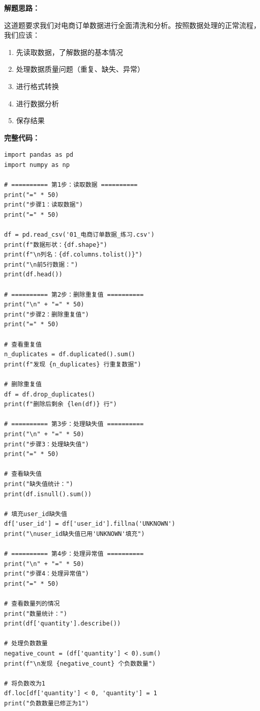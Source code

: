 \documentclass[12pt,a4paper]{article}
\begin{document}
\begin{practicebox}

\textbf{解题思路：}

这道题要求我们对电商订单数据进行全面清洗和分析。按照数据处理的正常流程，我们应该：
\begin{enumerate}
    \item 先读取数据，了解数据的基本情况
    \item 处理数据质量问题（重复、缺失、异常）
    \item 进行格式转换
    \item 进行数据分析
    \item 保存结果
\end{enumerate}

\textbf{完整代码：}

\begin{lstlisting}[caption={电商订单数据处理完整解答}]
import pandas as pd
import numpy as np

# ========== 第1步：读取数据 ==========
print("=" * 50)
print("步骤1：读取数据")
print("=" * 50)

df = pd.read_csv('01_电商订单数据_练习.csv')
print(f"数据形状：{df.shape}")
print(f"\n列名：{df.columns.tolist()}")
print("\n前5行数据：")
print(df.head())

# ========== 第2步：删除重复值 ==========
print("\n" + "=" * 50)
print("步骤2：删除重复值")
print("=" * 50)

# 查看重复值
n_duplicates = df.duplicated().sum()
print(f"发现 {n_duplicates} 行重复数据")

# 删除重复值
df = df.drop_duplicates()
print(f"删除后剩余 {len(df)} 行")

# ========== 第3步：处理缺失值 ==========
print("\n" + "=" * 50)
print("步骤3：处理缺失值")
print("=" * 50)

# 查看缺失值
print("缺失值统计：")
print(df.isnull().sum())

# 填充user_id缺失值
df['user_id'] = df['user_id'].fillna('UNKNOWN')
print("\nuser_id缺失值已用'UNKNOWN'填充")

# ========== 第4步：处理异常值 ==========
print("\n" + "=" * 50)
print("步骤4：处理异常值")
print("=" * 50)

# 查看数量列的情况
print("数量统计：")
print(df['quantity'].describe())

# 处理负数数量
negative_count = (df['quantity'] < 0).sum()
print(f"\n发现 {negative_count} 个负数数量")

# 将负数改为1
df.loc[df['quantity'] < 0, 'quantity'] = 1
print("负数数量已修正为1")


\end{lstlisting}
\end{practicebox}
\end{document}
